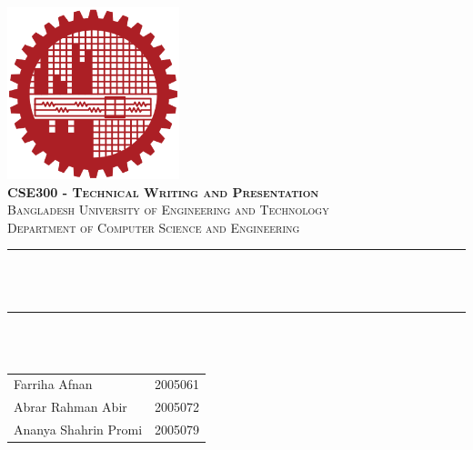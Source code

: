 \begin{titlepage}
    \newcommand{\HRule}{\rule{\linewidth}{0.5mm}} 
    \begin{center} 
        \includegraphics[width = 5cm]{./figures/BUET_LOGO.png}\\[1.5cm] 
        \textbf{\textsc{\Large CSE300 - Technical Writing and Presentation}}\\[1.0cm] 
        \textsc{\Large Bangladesh University of Engineering and Technology}\\[0.5cm] 
        \textsc{\large Department of Computer Science and Engineering}\\[0.95cm] 
        \HRule \\[0.4cm]
        { 
            \huge 
            \bfseries 
            \reporttitle
        }\\
        { 
            \LARGE 
            \bfseries 
            \reportsubtitle
        }
        \HRule \\[1cm]
        \makeatletter \large
        \@date\\
        \vspace{2cm}
        \Large
        \begin{tabular}{ll}
            Farriha Afnan & 2005061 \\
            Abrar Rahman Abir & 2005072\\
            Ananya Shahrin Promi & 2005079
        \end{tabular}
    \end{center}
\end{titlepage}

